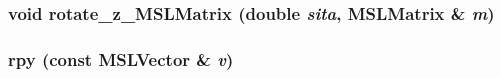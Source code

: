 \subsubsection{\setlength{\rightskip}{0pt plus 5cm}void rotate\_\-z\_\-MSLMatrix (double {\em sita}, {\bf MSLMatrix} \& {\em m})}\label{renderglobj_h_a61}


\subsubsection{ rpy (const {\bf MSLVector} \& {\em v})}\label{renderglobj_h_a68}


